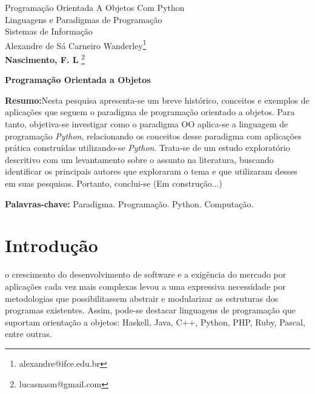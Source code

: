 \documentclass[11pt,a4paper]{article}
\makeatletter
\newcommand{\aluno}{{\bf Nascimento, F. L}
\footnote{lucasnasm@gmail.com}}
\newcommand{\prof}{{ Alexandre de  S\'a Carneiro Wanderley}\footnote{alexandre@ifce.edu.br}}
\newcommand{\titu}{Programação Orientada A Objetos Com Python}
\newcommand{\disc}{Linguagens e Paradigmas de Programação}
\newcommand{\curso}{Sistemas de Informação}
\makeatother
\begin{document}
\Large
\begin{center} \titu\\ \disc\\ \curso \\ \prof \\ \aluno
\end{center}

\vspace{0.9in}
\vspace{0.9in}
\begin{center}\textbf{Programação Orientada a Objetos}\end{center}

\newpage 
\tableofcontents
\vspace{0.9in}
\vspace{0.9in}


\segundapagina
% 
\begin{footnotesize}{\normalsize \noindent \textbf{Resumo:}Nesta pesquisa apresenta-se um breve histórico, conceitos e exemplos de aplicações que seguem o paradigma de programação orientado a objetos. 
Para tanto, objetiva-se investigar como o paradigma OO aplica-se a linguagem de 
programação \textit{Python}, relacionando os conceitos desse paradigma com aplicações prática construídas utilizando-se \textit{Python}. 
Trata-se de um estudo exploratório descritivo com um levantamento sobre o assunto na literatura, buscando identificar os principais autores que exploraram o tema e que utilizaram desses em suas pesquisas. Portanto, conclui-se (Em construção...)

\noindent\textbf{Palavras-chave:} Paradigma. Programação. Python. Computação.}
\end{footnotesize}
% 
% 
\segundapagina
\section{Introdução}

o crescimento do desenvolvimento de software e a exigência do mercado por aplicações cada vez mais complexas levou a uma expressiva necessidade por metodologias que possibilitassem abstrair e modularizar as estruturas dos programas existentes. Assim, pode-se destacar linguagens de programação que suportam orientação a objetos: Haskell, Java, C++, Python, PHP, Ruby, Pascal, entre outras.
\end{document}
